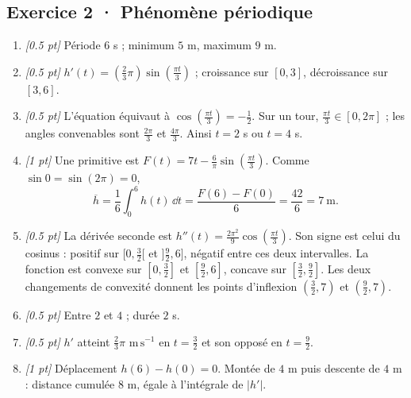 \subsection*{Exercice 2 · Phénomène périodique}\begin{enumerate}

\item \textit{[\num{0,5} pt]} Période $6$ s ; minimum $5$ m, maximum $9$ m.

\item \textit{[\num{0,5} pt]} $h'(t)=(\frac{2}{3}\pi)\sin (\frac{\pi t}{3})$ ; croissance sur $[0,3]$, décroissance sur $[3,6]$.

\item \textit{[\num{0,5} pt]} L'équation équivaut à $\cos (\frac{\pi t}{3})=-\frac{1}{2}$. Sur un tour, $\frac{\pi t}{3}\in[0,2\pi]$ ; les angles convenables sont $\frac{2\pi}{3}$ et $\frac{4\pi}{3}$. Ainsi $t=2$ s ou $t=4$ s.

\item \textit{[1 pt]} Une primitive est $F(t)=7t-\frac{6}{\pi}\sin (\frac{\pi t}{3})$. Comme $\sin0=\sin(2\pi)=0$,
\[\overline h=\frac{1}{6}\int_0^{6}h(t)\,\dd t=\frac{F(6)-F(0)}{6}=\frac{42}{6}=7\ \mathrm{m}.\]

\item \textit{[\num{0,5} pt]} La dérivée seconde est $h''(t)=\frac{2\pi^2}{9}\cos (\frac{\pi t}{3})$. Son signe est celui du cosinus : positif sur $[0,\frac{3}{2}[$ et $]\frac{9}{2},6]$, négatif entre ces deux intervalles. La fonction est convexe sur $[0,\frac{3}{2}]$ et $[\frac{9}{2},6]$, concave sur $[\frac{3}{2},\frac{9}{2}]$. Les deux changements de convexité donnent les points d'inflexion $(\frac{3}{2},7)$ et $(\frac{9}{2},7)$.

\item \textit{[\num{0,5} pt]} Entre $2$ et $4$ ; durée $2$ s.

\item \textit{[\num{0,5} pt]} $h'$ atteint $\frac{2}{3}\pi$ $\mathrm{m\,s^{-1}}$ en $t=\frac{3}{2}$ et son opposé en $t=\frac{9}{2}$.

\item \textit{[1 pt]} Déplacement $h(6)-h(0)=0$. Montée de $4$ m puis descente de $4$ m : distance cumulée $8$ m, égale à l'intégrale de $|h'|$.

\end{enumerate}

